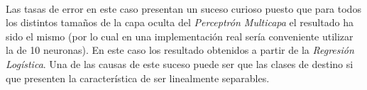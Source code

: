 \documentclass{article}
\begin{document}
		\paragraph{}
		Las tasas de error en este caso presentan un suceso curioso puesto que para todos los distintos tamaños de la capa oculta del \emph{Perceptrón Multicapa} el resultado ha sido el mismo (por lo cual en una implementación real sería conveniente utilizar la de 10 neuronas). En este caso los resultado obtenidos a partir de la \emph{Regresión Logística}. Una de las causas de este suceso puede ser que las clases de destino si que presenten la característica de ser linealmente separables.

	\nocite{subject:taa}
	\nocite{garciparedes:machine-learning-multilayer-perceptron}
	\nocite{garciparedes:machine-learning-regression}
	\nocite{garciparedes:machine-learning-single-layer-neural-networks}
	\nocite{dataset:computer-hardware}
	\nocite{dataset:wine}
  
  
\end{document}
